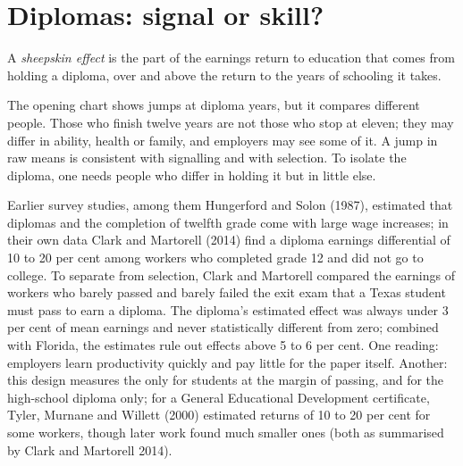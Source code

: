 \section{Diplomas: signal or skill?}\label{sec:b2:signalling-and-screening:diplomas}

\begin{definition}\label{def:b2:signalling-and-screening:sheepskin}
A \emph{sheepskin effect} is the part of the earnings return to education that comes from
holding a diploma, over and above the return to the years of schooling it takes.
\end{definition}

The opening chart shows jumps at diploma years, but it compares different people. Those who finish twelve years are not
those who stop at eleven; they may differ in ability, health or family, and employers may see some of it. A jump in
raw means is consistent with signalling and with selection. To isolate the diploma, one needs people who differ in
holding it but in little else.

\begin{debate}[Diplomas: signal or skill?]
Earlier survey studies, among them Hungerford and Solon (1987), estimated that diplomas and the completion of twelfth grade
come with large wage increases; in their own data Clark and Martorell (2014) find a diploma earnings differential of 10 to 20
per cent among workers who completed grade 12 and did not go to college. To separate  from selection, Clark and
Martorell compared the earnings of workers who barely passed and barely failed the exit exam that a Texas student must pass
to earn a diploma. The diploma's estimated effect was always under 3 per cent of mean earnings and never statistically
different from zero; combined with Florida, the estimates rule out effects above 5 to 6 per cent. One reading: employers learn
productivity quickly and pay little for the paper itself. Another: this design measures the  only for students at the
margin of passing, and for the high-school diploma only; for a General Educational Development certificate, Tyler, Murnane and
Willett (2000) estimated returns of 10 to 20 per cent for some workers, though later work found much smaller ones (both as
summarised by Clark and Martorell 2014).
\end{debate}

